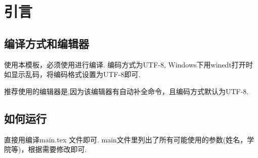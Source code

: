 \chapter{引言}
\section{编译方式和编辑器}
使用本模板，必须使用\XeLaTeX 进行编译. 编码方式为UTF-8, Windows下用winedt打开时如显示乱码，将编码格式设置为UTF-8即可.

推荐使用的编辑器是\TeXstudio,因为该编辑器有自动补全命令，且编码方式默认为UTF-8.

\section{如何运行}
直接用\XeLaTeX 编译main.tex 文件即可. main文件里列出了所有可能使用的参数(姓名，学院等)，根据需要修改即可.